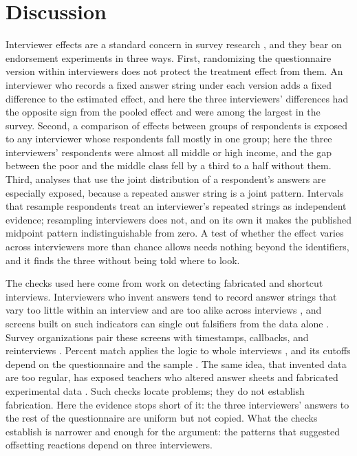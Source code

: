 \documentclass[11pt,letterpaper]{article}
\begin{document}
\section{Discussion}
\label{sec:discussion}

Interviewer effects are a standard concern in survey research \citep{west2017interviewer}, and they bear on endorsement experiments in three ways. First, randomizing the questionnaire version within interviewers does not protect the treatment effect from them. An interviewer who records a fixed answer string under each version adds a fixed difference to the estimated effect, and here the three interviewers' differences had the opposite sign from the pooled effect and were among the largest in the survey. Second, a comparison of effects between groups of respondents is exposed to any interviewer whose respondents fall mostly in one group; here the three interviewers' respondents were almost all middle or high income, and the gap between the poor and the middle class fell by a third to a half without them. Third, analyses that use the joint distribution of a respondent's answers are especially exposed, because a repeated answer string is a joint pattern. Intervals that resample respondents treat an interviewer's repeated strings as independent evidence; resampling interviewers does not, and on its own it makes the published midpoint pattern indistinguishable from zero. A test of whether the effect varies across interviewers more than chance allows needs nothing beyond the identifiers, and it finds the three without being told where to look.

The checks used here come from work on detecting fabricated and shortcut interviews. Interviewers who invent answers tend to record answer strings that vary too little within an interview and are too alike across interviews \citep{schraepler2005characteristics,menold2014real,blasius2015should}, and screens built on such indicators can single out falsifiers from the data alone \citep{bredl2012statistical,schwanhaeuser2022catch,olbrich2024detecting}. Survey organizations pair these screens with timestamps, callbacks, and reinterviews \citep{murphy2016interviewer,dematteis2020falsification}. Percent match applies the logic to whole interviews \citep{kuriakose2016duped}, and its cutoffs depend on the questionnaire and the sample \citep{simmons2016duped}. The same idea, that invented data are too regular, has exposed teachers who altered answer sheets \citep{jacob2003rotten} and fabricated experimental data \citep{simonsohn2013just,broockman2015irregularities}. Such checks locate problems; they do not establish fabrication. Here the evidence stops short of it: the three interviewers' answers to the rest of the questionnaire are uniform but not copied. What the checks establish is narrower and enough for the argument: the patterns that suggested offsetting reactions depend on three interviewers.
\end{document}
